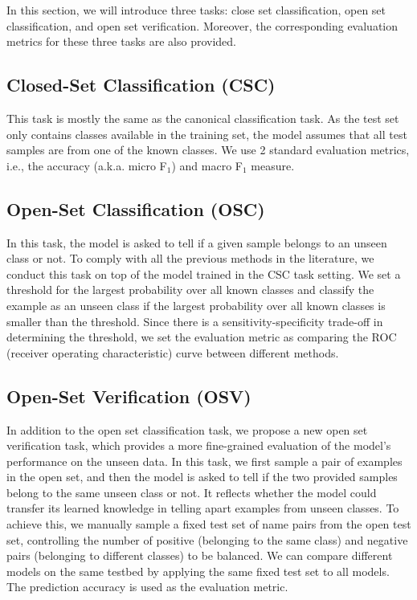 \documentclass{article}
\begin{document}
In this section, we will introduce three tasks: close set classification, open set classification, and open set verification. Moreover, the corresponding evaluation metrics for these three tasks are also provided. 

\subsection{Closed-Set Classification (CSC)} \label{csc}
This task is mostly the same as the canonical classification task. As the test set only contains classes available in the training set, the model assumes that all test samples are from one of the known classes. We use 2 standard evaluation metrics, i.e., the accuracy (a.k.a. micro F$_1$) and macro F$_1$ measure. 

\subsection{Open-Set Classification (OSC)} \label{osc}
In this task, the model is asked to tell if a given sample belongs to an unseen class or not. To comply with all the previous methods in the literature, we conduct this task on top of the model trained in the CSC task setting. We set a threshold for the largest probability over all known classes and classify the example as an unseen class if the largest probability over all known classes is smaller than the threshold.
Since there is a sensitivity-specificity trade-off in determining the threshold, we set the evaluation metric as comparing the ROC (receiver operating characteristic) curve between different methods. 

\subsection{Open-Set Verification (OSV)} \label{osv}
In addition to the open set classification task, we propose a new open set verification task, which provides a more fine-grained evaluation of the model's performance on the unseen data. In this task, we first sample a pair of examples in the open set, and then the model is asked to tell if the two provided samples belong to the same unseen class or not. It reflects whether the model could transfer its learned knowledge in telling apart examples from unseen classes.  
To achieve this, we manually sample a fixed test set of name pairs from the open test set, controlling the number of positive (belonging to the same class) and negative pairs (belonging to different classes) to be balanced. We can compare different models on the same testbed by applying the same fixed test set to all models. The prediction accuracy is used as the evaluation metric.
\end{document}
